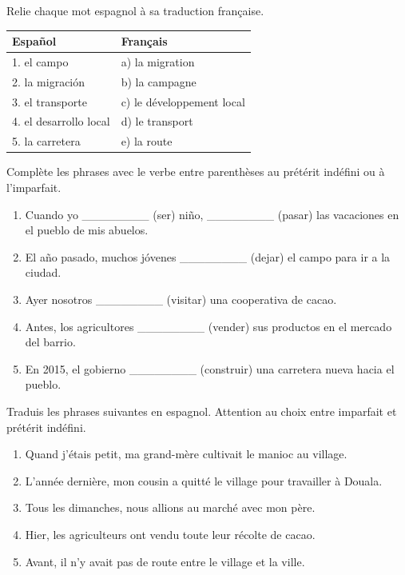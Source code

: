 \documentclass[11pt]{article}
\newcounter{popsec}
\newcounter{popsub}
\newcommand{\courssub}[1]{%
  \stepcounter{popsub}%
  \par\vspace{9pt}\noindent{\popxbold\fontsize{11.5}{13}\selectfont\color{popink}{\color{poporange}\thepopsec.\thepopsub}\hspace{6pt}#1}\par\nopagebreak\vspace{4pt}
}
\begin{document}
\begin{exercice}
Relie chaque mot espagnol à sa traduction française.

\begin{center}
\begin{tabularx}{\linewidth}{|X|X|}
\hline
\rowcolor{popblueL} \textbf{Español} & \textbf{Français} \\
\hline
1. el campo & a) la migration \\
\hline
2. la migración & b) la campagne \\
\hline
3. el transporte & c) le développement local \\
\hline
4. el desarrollo local & d) le transport \\
\hline
5. la carretera & e) la route \\
\hline
\end{tabularx}
\end{center}
\end{exercice}

\begin{exercice}
Complète les phrases avec le verbe entre parenthèses au prétérit indéfini ou à l'imparfait.
\begin{enumerate}
\item Cuando yo \_\_\_\_\_\_\_\_ (ser) niño, \_\_\_\_\_\_\_\_ (pasar) las vacaciones en el pueblo de mis abuelos.
\item El año pasado, muchos jóvenes \_\_\_\_\_\_\_\_ (dejar) el campo para ir a la ciudad.
\item Ayer nosotros \_\_\_\_\_\_\_\_ (visitar) una cooperativa de cacao.
\item Antes, los agricultores \_\_\_\_\_\_\_\_ (vender) sus productos en el mercado del barrio.
\item En 2015, el gobierno \_\_\_\_\_\_\_\_ (construir) una carretera nueva hacia el pueblo.
\end{enumerate}
\end{exercice}

\courssub{Je m'entraîne}

\begin{exercice}
Traduis les phrases suivantes en espagnol. Attention au choix entre imparfait et prétérit indéfini.
\begin{enumerate}
\item Quand j'étais petit, ma grand-mère cultivait le manioc au village.
\item L'année dernière, mon cousin a quitté le village pour travailler à Douala.
\item Tous les dimanches, nous allions au marché avec mon père.
\item Hier, les agriculteurs ont vendu toute leur récolte de cacao.
\item Avant, il n'y avait pas de route entre le village et la ville.
\end{enumerate}
\end{exercice}
\end{document}
